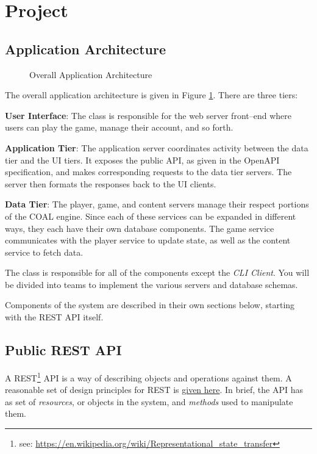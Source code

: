 \documentclass{article}
\newcommand{\enterProblemHeader}[1]{
}
\newcommand{\exitProblemHeader}[1]{
\nobreak\extramarks{#1}{}\nobreak
}
\newcounter{homeworkProblemCounter} %
\newcommand{\homeworkProblemName}{}
\newenvironment{homeworkProblem}[1][Problem \arabic{homeworkProblemCounter}]{ %
\stepcounter{homeworkProblemCounter} %
\renewcommand{\homeworkProblemName}{#1} %
\section{\homeworkProblemName} %
\enterProblemHeader{\homeworkProblemName} %
}{
\exitProblemHeader{\homeworkProblemName} %
}
\newcommand{\homeworkSectionName}{}
\newenvironment{homeworkSection}[1]{ %
\renewcommand{\homeworkSectionName}{#1} %
\subsection{\homeworkSectionName} %
\enterProblemHeader{\homeworkProblemName\ [\homeworkSectionName]} %
}{
\enterProblemHeader{\homeworkProblemName} %
}
\begin{document}
\begin{homeworkProblem}[Project]
\begin{homeworkSection}{Application Architecture}
\begin{figure}
\caption{Overall Application Architecture}
\label{fig:arch}
\end{figure}

The overall application architecture is given in Figure \ref{fig:arch}. There are three tiers:
\begin{compactitem}
	\item \textbf{User Interface}: The class is responsible for the web server front--end where users can play the game, manage their account, and so forth.
	\item \textbf{Application Tier}: The application server coordinates activity between the data tier and the UI tiers. It exposes the public API, as given in the OpenAPI specification, and makes corresponding requests to the data tier servers. The server then formats the responses back to the UI clients.
	\item \textbf{Data Tier}: The player, game, and content servers manage their respect portions of the COAL engine. Since each of these services can be expanded in different ways, they each have their own database components. The game service communicates with the player service to update state, as well as the content service to fetch data. 
\end{compactitem}

The class is responsible for all of the components except the \textit{CLI Client}. You will be divided into teams to implement the various servers and database schemas.

Components of the system are described in their own sections below, starting with the REST API itself.
\end{homeworkSection}


\begin{homeworkSection}{Public REST API}
	A REST\footnote{see: \url{https://en.wikipedia.org/wiki/Representational_state_transfer}} API is a way of describing objects and operations against them. A reasonable set of design principles for REST is \href{https://restfulapi.net/}{given here}. In brief, the API has as set of \textit{resources}, or objects in the system, and \textit{methods} used to manipulate them.


\end{homeworkSection}
\end{homeworkProblem}
\end{document}
